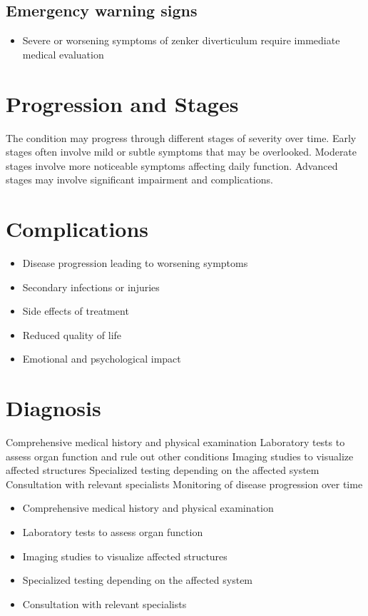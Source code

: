 \subsection{Emergency warning signs}
\begin{itemize}[noitemsep]
  \item Severe or worsening symptoms of zenker diverticulum require immediate medical evaluation
\end{itemize}
\section{Progression and Stages}
The condition may progress through different stages of severity over time. Early stages often involve mild or subtle symptoms that may be overlooked. Moderate stages involve more noticeable symptoms affecting daily function. Advanced stages may involve significant impairment and complications.
\section{Complications}
\begin{itemize}[noitemsep]
  \item Disease progression leading to worsening symptoms
  \item Secondary infections or injuries
  \item Side effects of treatment
  \item Reduced quality of life
  \item Emotional and psychological impact
\end{itemize}
\section{Diagnosis}
Comprehensive medical history and physical examination Laboratory tests to assess organ function and rule out other conditions Imaging studies to visualize affected structures Specialized testing depending on the affected system Consultation with relevant specialists Monitoring of disease progression over time

\begin{itemize}[noitemsep]
  \item Comprehensive medical history and physical examination
  \item Laboratory tests to assess organ function
  \item Imaging studies to visualize affected structures
  \item Specialized testing depending on the affected system
  \item Consultation with relevant specialists
\end{itemize}
